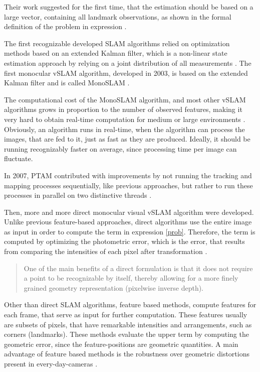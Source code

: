 Their work suggested for the first time, that the estimation should be based on a large vector, containing all landmark observations, as shown in the formal definition of the problem in 
expression \label{prob}.

The first recognizable developed SLAM algorithms relied on optimization methods based on an extended Kalman filter, which is a non-linear state estimation approach
 by relying on a joint distribution of all measurements \cite{evolved}. The first monocular vSLAM algorithm, developed in 2003, 
 is based on the extended Kalman filter and is called MonoSLAM \cite{mono}. 
 
 The computational cost of the MonoSLAM algorithm, and most other vSLAM algorithms grows in proportion to the number of observed features, making it very hard to obtain real-time 
 computation for medium or large environments \cite{evolved}. Obviously, an algorithm runs in real-time, when 
 the algorithm can process the images, that are fed to it, just as fast as they are produced. Ideally, it should 
 be running recognizably faster on average, since processing time per image can fluctuate. 

 In 2007, PTAM contributed with improvements by not running the tracking and mapping processes
 sequentially, like previous approaches, but rather to run these processes in parallel on two distinctive threads \cite{ptam}. 
 
 Then, more and more direct monocular visual vSLAM algorithm were developed. Unlike previous feature-based approaches, direct algorithms use the entire image as input in order to compute the term in expression \ref{prob}. 
 Therefore, the term is computed by optimizing the photometric error, which is the error, that results from comparing the intensities 
 of each pixel after transformation \cite{dso}.

  \begin{quote}
	One of the main benefits of a direct formulation is that it
	does not require a point to be recognizable by itself, thereby
	allowing for a more finely grained geometry representation (pixelwise inverse depth). \cite{dso}
  \end{quote}

Other than direct SLAM algorithms, feature based methods, compute features for each frame, that serve as input for further computation. These features usually are subsets of pixels, that have remarkable 
intensities and arrangements, such as corners (landmarks). These methods evaluate the upper term by computing the geometric error, since the feature-positions are geometric 
quantities. A main advantage of feature based methods is the robustness over geometric distortions present in every-day-cameras \cite{dso}. 

